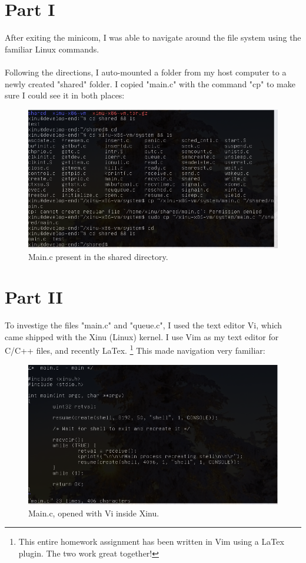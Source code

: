 \documentclass{article}
\begin{document}
\section{Part I}
After exiting the minicom, I was able to navigate around the file system using the familiar Linux commands. \\\\
Following the directions, I auto-mounted a folder from my host computer to a newly created "shared" folder. I copied
"main.c" with the command "cp" to make sure I could see it in both places:

\begin{figure}[ht!]
  \includegraphics[width=\textwidth]{mainshare.png}
  \caption{Main.c present in the shared directory.}
\end{figure}



\section{Part II}

To investige the files "main.c" and "queue.c", I used the text editor Vi, which came shipped with the Xinu (Linux) kernel.
I use Vim as my text editor for C/C++ files, and recently LaTex. \footnote{This entire homework assignment has been written
in Vim using a LaTex plugin. The two work great together!} This made navigation very familiar:
\begin{figure}[ht!]
  \includegraphics[width=\textwidth]{mainvi.png}
  \caption{Main.c, opened with Vi inside Xinu.}
\end{figure}
\end{document}
